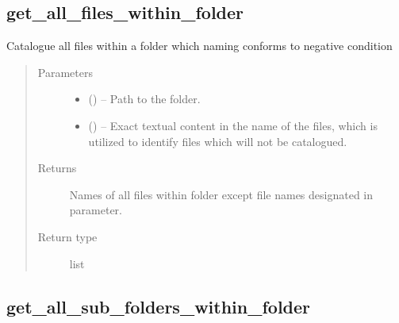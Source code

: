 \documentclass[letterpaper,10pt,english]{sphinxmanual}
\begin{document}
\subsection{get\_all\_files\_within\_folder}
\label{\detokenize{api/ucf.get_all_files_within_folder:get-all-files-within-folder}}\label{\detokenize{api/ucf.get_all_files_within_folder::doc}}

\begin{fulllineitems}
\label{\detokenize{api/ucf.get_all_files_within_folder:ucf.get_all_files_within_folder}}
Catalogue all files within a folder which naming conforms to negative
condition
\begin{quote}\begin{description}
\item[{Parameters}] \leavevmode\begin{itemize}
\item {} 
 () -- Path to the folder.

\item {} 
 () -- Exact textual content in the name of the files, which is
utilized to identify files which will not be catalogued.

\end{itemize}

\item[{Returns}] \leavevmode
Names of all files within folder except file names designated in
 parameter.

\item[{Return type}] \leavevmode
list

\end{description}\end{quote}

\end{fulllineitems}



\subsection{get\_all\_sub\_folders\_within\_folder}
\label{\detokenize{api/ucf.get_all_sub_folders_within_folder:get-all-sub-folders-within-folder}}\label{\detokenize{api/ucf.get_all_sub_folders_within_folder::doc}}
\end{document}
